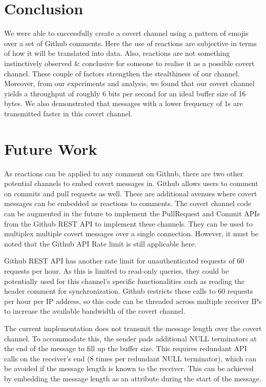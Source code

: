 \documentclass[conference]{IEEEtran}
\begin{document}
\section{Conclusion}
We were able to successfully create a covert channel using a pattern of emojis over a set of Github comments. Here the use of reactions are subjective in terms of how it will be translated into data. Also, reactions are not something instinctively observed \& conclusive for someone to realise it as a possible covert channel. These couple of factors strengthen the stealthiness of our channel. Moreover, from our experiments and analysis, we found that our covert channel yields a throughput of roughly 6 bits per second for an ideal buffer size of 16 bytes. We also demonstrated that messages with a lower frequency of 1s are transmitted faster in this covert channel. 

\section{Future Work}
As reactions can be applied to any comment on Github, there are two other potential channels to embed covert messages in. Github allows users to comment on commits and pull requests as well. These are additional avenues where covert messages can be embedded as reactions to comments. The covert channel code can be augmented in the future to implement the PullRequest and Commit APIs from the Github REST API to implement these channels. They can be used to multiplex multiple covert messages over a single connection. However, it must be noted that the Github API Rate limit is still applicable here. 

Github REST API has another rate limit for unauthenticated requests of 60 requests per hour. As this is limited to read-only queries, they could be potentially used for this channel's specific functionalities such as reading the header comment for synchronization. Github restricts these calls to 60 requests per hour per IP address, so this code can be threaded across multiple receiver IPs to increase the available bandwidth of the covert channel.

The current implementation does not transmit the message length over the covert channel. To accommodate this, the sender pads additional NULL terminators at the end of the message to fill up the buffer size. This requires redundant API calls on the receiver's end (8 times per redundant NULL terminator), which can be avoided if the message length is known to the receiver. This can be achieved by embedding the message length as an attribute during the start of the message.
\end{document}

